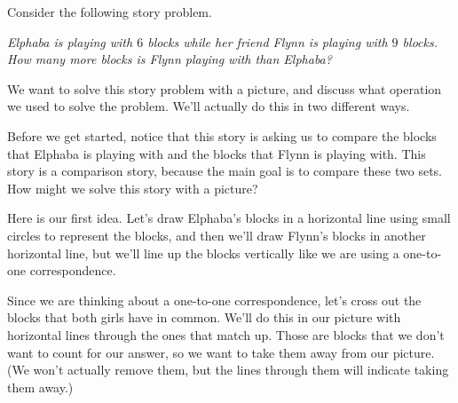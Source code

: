 \documentclass{ximera}
\begin{document}
\begin{example}
Consider the following story problem.

\emph{Elphaba is playing with $6$ blocks while her friend Flynn is playing with $9$ blocks. How many more blocks is Flynn playing with than Elphaba?}

We want to solve this story problem with a picture, and discuss what operation we used to solve the problem. We'll actually do this in two different ways.

Before we get started, notice that this story is asking us to compare the blocks that Elphaba is playing with and the blocks that Flynn is playing with. This story is a comparison story, because the main goal is to compare these two sets. How might we solve this story with a picture?

Here is our first idea. Let's draw Elphaba's blocks in a horizontal line using small circles to represent the blocks, and then we'll draw Flynn's blocks in another horizontal line, but we'll line up the blocks vertically like we are using a one-to-one correspondence.

\begin{image}
\end{image}

Since we are thinking about a one-to-one correspondence, let's cross out the blocks that both girls have in common. We'll do this in our picture with horizontal lines through the ones that match up. Those are blocks that we don't want to count for our answer, so we want to take them away from our picture. (We won't actually remove them, but the lines through them will indicate taking them away.)

\begin{image}
\end{image}


\end{example}
\end{document}
